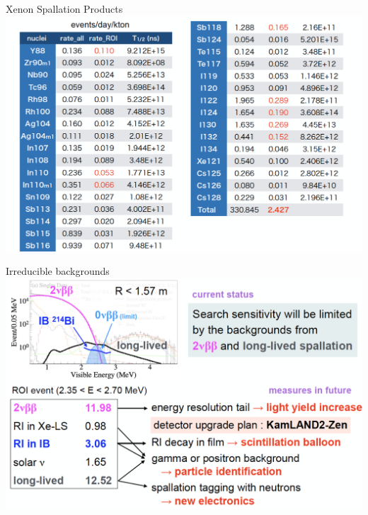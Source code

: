 \documentclass [aspectratio=169]{beamer}
\begin{document}
\begin{frame}{Xenon Spallation Products}
\includegraphics[scale=0.30]{xeSpallation.png}
\end{frame}


\begin{frame}{Irreducible backgrounds}
\includegraphics[scale=0.30]{kzsensi.png}
\end{frame}



\end{document}
